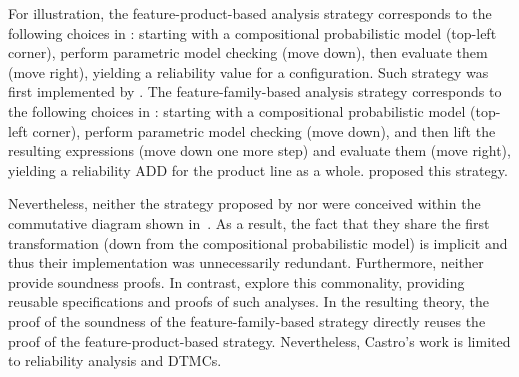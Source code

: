 
For illustration, the feature-product-based analysis strategy corresponds to the following choices in  : starting with a compositional probabilistic model (top-left corner), perform parametric model checking (move down), then evaluate them (move right), yielding a reliability value for a configuration. Such strategy was first implemented by \citet{Ghezzi2013}. The feature-family-based analysis strategy corresponds to the following choices in  : starting with a compositional probabilistic model (top-left corner), perform parametric model checking (move down), and then lift the resulting expressions (move down one more step) and evaluate them (move right), yielding  a reliability ADD for the product line as a whole.  \citet{LANNA2017} proposed this strategy. 

Nevertheless, neither the strategy proposed by \citet{Ghezzi2013} nor \citet{LANNA2017} were conceived within the commutative diagram shown in~. As a result, the fact that they share the first transformation (down from the compositional probabilistic model) is implicit and thus their implementation was unnecessarily redundant. Furthermore, neither provide soundness proofs. In contrast, \citet{Castro2017} explore this commonality, providing reusable specifications and proofs of such analyses. In the resulting theory, the proof of the soundness of the feature-family-based strategy directly reuses the proof of the feature-product-based strategy. 
Nevertheless, Castro's work is limited to reliability analysis and DTMCs.







